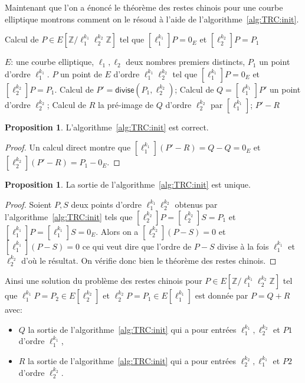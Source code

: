 \documentclass[10pt,a4paper]{book}
\theoremstyle{plain}
\theoremstyle{definition}
\theoremstyle{definition}
\theoremstyle{definition}
\newtheorem{prop}[thm]{Proposition}
\theoremstyle{definition}
\theoremstyle{remark}
\theoremstyle{remark}
\theoremstyle{definition}
\begin{document}
Maintenant que l'on a énoncé le théorème des restes chinois pour une courbe elliptique montrons comment on le résoud à l'aide de l'algorithme~\ref{alg:TRC:init}.
\begin{algorithm}
\caption{\label{alg:TRC:init}Calcul de $P \in E[\mathbb{Z}/\ell_1^{k_1}\ell_2^{k_2}\mathbb{Z}]$ tel que $[\ell_1^{k_1}]P=0_E$ et $[\ell_2^{k_2}]P=P_1$}
\begin{algorithmic}[1]
\REQUIRE $E$: une courbe elliptique, $\ell_1,\ell_2$ deux nombres premiers distincts, $P_1$ un point d'ordre $\ell_1^{k_1}$.
\ENSURE $P$ un point de $E$ d'ordre $\ell_1^{k_1}\ell_2^{k_2}$  tel que $[\ell_1^{k_1}]P=0_E$ et $[\ell_2^{k_2}]P=P_1$.
\STATE \label{alg:TRC:init:div} Calcul de $P'=\mathsf{divise}(P_1,\ell_2^{k_2})$;
\STATE \label{alg:TRC:init:mul} Calcul de $Q=[\ell_1^{k_1}]P'$ un point d'ordre $\ell_2^{k_2}$;
\STATE \label{alg:TRC:init:prim} Calcul de $R$ la pré-image de $Q$ d'ordre $\ell_2^{k_2}$ par $[\ell_1^{k_1}]$;
\RETURN $P'-R$
\end{algorithmic}
\end{algorithm}

\begin{prop}
L'algorithme~\ref{alg:TRC:init} est correct.
\end{prop}

\begin{proof}
Un calcul direct montre que $[\ell_1^{k_1}](P'-R)=Q-Q=0_E$ et 
 $[\ell_2^{k_2}](P'-R)=P_1-0_E$.
\end{proof}

\begin{prop}
La sortie de l'algorithme~\ref{alg:TRC:init} est unique.
\end{prop}

\begin{proof}
Soient $P,S$ deux points d'ordre $\ell_1^{k_1}\ell_2^{k_2}$  obtenus par 
l'algorithme~\ref{alg:TRC:init}  tels que 
$[\ell_2^{k_2}]P=[\ell_2^{k_2}]S=P_1$ et  
$[\ell_1^{k_1}]P=[\ell_1^{k_1}]S=0_E$. Alors on a $[\ell_2^{k_2}](P-S)=0$ et 
$[\ell_1^{k_1}](P-S)=0$ ce qui veut dire que l'ordre de $P-S$ divise à la fois 
$\ell_1^{k_1}$ et $\ell_2^{k_2}$ d'où le résultat. On vérifie donc bien le 
théorème des restes chinois.
\end{proof}

Ainsi une solution du problème des restes chinois pour $P \in E[\mathbb{Z}/
\ell_1^{k_1} \ell_2^{k_2}\mathbb{Z}]$ tel que $\ell_1^{k_1}P=P_2 \in 
E[\ell_2^{k_2}]$ et $\ell_2^{k_2}P=P_1 \in E[\ell_1^{k_1}]$ est donnée par 
$P=Q+R$ avec:
\begin{itemize}
\item $Q$ la sortie de l'algorithme~\ref{alg:TRC:init} qui a pour entrées
$\ell_1^{k_1}, \ell_2^{k_2}$ et $P1$ d'ordre $\ell_1^{k_1}$,
\item  $R$ la sortie de l'algorithme~\ref{alg:TRC:init} qui a pour entrées
$\ell_2^{k_2}, \ell_1^{k_1}$ et $P2$ d'ordre $\ell_2^{k_2}$.
\end{itemize}
\end{document}
